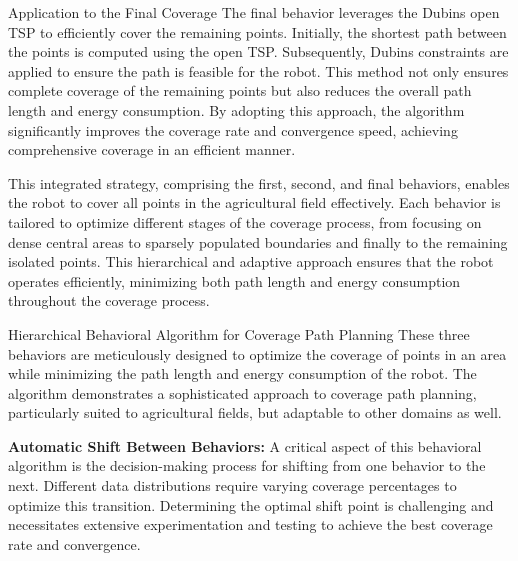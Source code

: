 \vspace*{6mm}   

Application to the Final Coverage
The final behavior leverages the Dubins open TSP to efficiently cover the remaining points. Initially, the shortest path between the points is computed using the open TSP. Subsequently, Dubins constraints are applied to ensure the path is feasible for the robot. This method not only ensures complete coverage of the remaining points but also reduces the overall path length and energy consumption. By adopting this approach, the algorithm significantly improves the coverage rate and convergence speed, achieving comprehensive coverage in an efficient manner.

\vspace*{6mm}   

This integrated strategy, comprising the first, second, and final behaviors, enables the robot to cover all points in the agricultural field effectively. Each behavior is tailored to optimize different stages of the coverage process, from focusing on dense central areas to sparsely populated boundaries and finally to the remaining isolated points. This hierarchical and adaptive approach ensures that the robot operates efficiently, minimizing both path length and energy consumption throughout the coverage process.


\vspace*{6mm}   



Hierarchical Behavioral Algorithm for Coverage Path Planning
These three behaviors are meticulously designed to optimize the coverage of points in an area while minimizing the path length and energy consumption of the robot. The algorithm demonstrates a sophisticated approach to coverage path planning, particularly suited to agricultural fields, but adaptable to other domains as well.

\vspace*{6mm}   

\textbf{Automatic Shift Between Behaviors: }
A critical aspect of this behavioral algorithm is the decision-making process for shifting from one behavior to the next. Different data distributions require varying coverage percentages to optimize this transition. Determining the optimal shift point is challenging and necessitates extensive experimentation and testing to achieve the best coverage rate and convergence.

\vspace*{6mm}   

